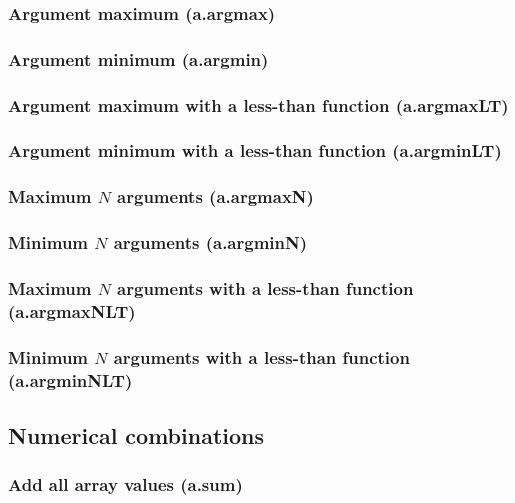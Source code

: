 \documentclass{article}
\theoremstyle{definition}
\begin{document}
\subsubsection{Argument maximum (a.argmax)}

\subsubsection{Argument minimum (a.argmin)}

\subsubsection{Argument maximum with a less-than function (a.argmaxLT)}

\subsubsection{Argument minimum with a less-than function (a.argminLT)}

\subsubsection{Maximum $N$ arguments (a.argmaxN)}

\subsubsection{Minimum $N$ arguments (a.argminN)}

\subsubsection{Maximum $N$ arguments with a less-than function (a.argmaxNLT)}

\subsubsection{Minimum $N$ arguments with a less-than function (a.argminNLT)}

\subsection{Numerical combinations}

\subsubsection{Add all array values (a.sum)}
\end{document}
